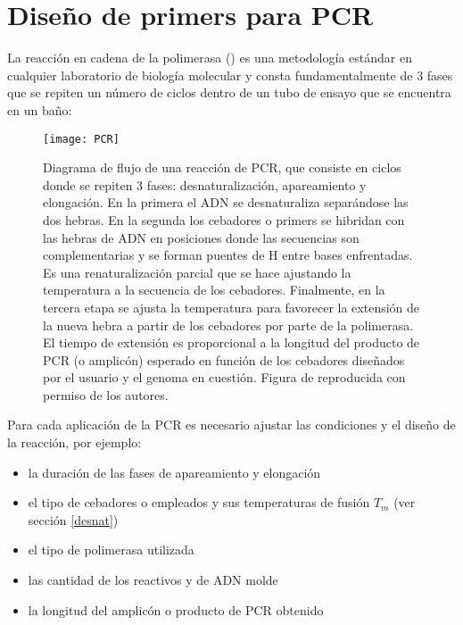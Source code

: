 \section{Dise\~no de primers para PCR} \label{dna2}

La reacci\'{o}n en cadena de la polimerasa 
()
es una metodolog\'{i}a est\'{a}ndar en cualquier laboratorio de biolog\'{i}a molecular y consta fundamentalmente
de 3 fases que se repiten un n\'{u}mero de ciclos dentro de un tubo de ensayo que se encuentra en un ba\~{n}o:

\begin{figure}
\begin{center} 
\texttt{[image: PCR]}
\caption
{
Diagrama de flujo de una reacci\'{o}n de PCR, 
que consiste en ciclos donde se repiten 3 fases: desnaturalizaci\'{o}n, apareamiento y elongaci\'{o}n.
En la primera el ADN se desnaturaliza separ\'{a}ndose las dos hebras.
En la segunda los cebadores o primers se hibridan con las hebras de ADN en posiciones donde las 
secuencias son complementarias y se forman puentes de H entre bases enfrentadas. 
Es una renaturalizaci\'{o}n parcial que se hace ajustando la temperatura a la secuencia de los cebadores. 
Finalmente, en la tercera etapa se ajusta la temperatura para favorecer la extensi\'{o}n de la nueva hebra
a partir de los cebadores por parte de la polimerasa. 
El tiempo de extensi\'{o}n es proporcional a la longitud del producto de PCR (o amplic\'{o}n) esperado
en funci\'{o}n de los cebadores dise\~{n}ados por el usuario y el genoma en cuesti\'{o}n.
Figura de \cite{Konietzny2003} reproducida con permiso de los autores.
}
\label{fig:PCR}
\end{center}
\end{figure}

Para cada aplicaci\'{o}n de la PCR es necesario ajustar las condiciones y el dise\~no de la reacci\'{o}n,
por ejemplo:
\begin{itemize} 
\item la duraci\'{o}n de las fases de apareamiento y elongaci\'{o}n
\item el tipo de cebadores o  empleados y sus temperaturas de fusi\'{o}n $T_{m}$ (ver secci\'{o}n \ref{desnat})
\item el tipo de polimerasa utilizada
\item las cantidad de los reactivos y de ADN molde
\item la longitud del amplic\'{o}n o producto de PCR obtenido
\end{itemize}

